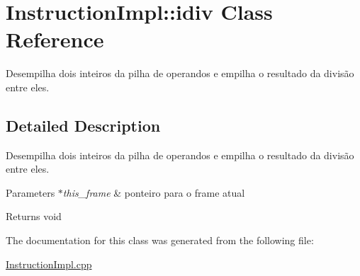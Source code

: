 \hypertarget{class_instruction_impl_1_1idiv}{}\section{Instruction\+Impl\+:\+:idiv Class Reference}
\label{class_instruction_impl_1_1idiv}


Desempilha dois inteiros da pilha de operandos e empilha o resultado da divisão entre eles.  




\subsection{Detailed Description}
Desempilha dois inteiros da pilha de operandos e empilha o resultado da divisão entre eles. 


\begin{DoxyParams}{Parameters}
{\em $\ast$this\+\_\+frame} & ponteiro para o frame atual \\
\hline
\end{DoxyParams}
\begin{DoxyReturn}{Returns}
void 
\end{DoxyReturn}


The documentation for this class was generated from the following file\+:\begin{DoxyCompactItemize}
\item 
\hyperlink{_instruction_impl_8cpp}{Instruction\+Impl.\+cpp}\end{DoxyCompactItemize}
